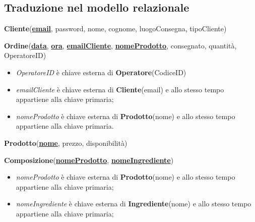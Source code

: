 \documentclass[12pt,a4paper]{article}
\begin{document}
    \newpage
    \subsection{Traduzione nel modello relazionale}
    \begin{tcolorbox}[
        colback=gray!8,
        colframe=black!30,
        title=
    ]
        \textbf{Cliente}(\textbf{\uline{email}}, password, nome, cognome, luogoConsegna, tipoCliente)
    \end{tcolorbox}

    \begin{tcolorbox}[
        colback=gray!8,
        colframe=black!30,
        title=
    ]
        \textbf{Ordine}(\uline{\textbf{data}}, \textbf{\uline{ora}}, \textbf{\uline{emailCliente}}, \textbf{\uline{nomeProdotto}}, consegnato, quantità, OperatoreID)
        \begin{itemize}[leftmargin=1em]
            \item \textit{OperatoreID} è chiave esterna di \textbf{Operatore}(CodiceID)
            \item \textit{emailCliente} è chiave esterna di \textbf{Cliente}(email) e allo stesso tempo appartiene alla chiave primaria;
            \item \textit{nomeProdotto} è chiave esterna di \textbf{Prodotto}(nome) e allo stesso tempo appartiene alla chiave primaria.
        \end{itemize}
    \end{tcolorbox}
    
    \begin{tcolorbox}[
        colback=gray!8,
        colframe=black!30,
        title=
    ]
        \textbf{Prodotto}(\textbf{\uline{nome}}, prezzo, disponibilità)
    \end{tcolorbox}

    \begin{tcolorbox}[
        colback=gray!8,
        colframe=black!30,
        title=
    ]
        \textbf{Composizione}(\textbf{\uline{nomeProdotto}}, \textbf{\uline{nomeIngrediente}})
        \begin{itemize}[leftmargin=1em]
            \item \textit{nomeProdotto} è chiave esterna di \textbf{Prodotto}(nome) e allo stesso tempo appartiene alla chiave primaria;
            \item \textit{nomeIngrediente} è chiave esterna di \textbf{Ingrediente}(nome) e allo stesso tempo appartiene alla chiave primaria;
        \end{itemize}
    \end{tcolorbox}
\end{document}
